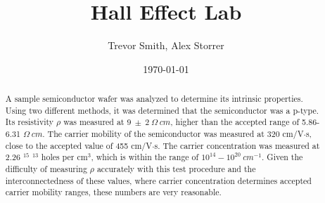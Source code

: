 \documentclass[aps,prl,reprint]{revtex4-2}
\begin{document}

\title{Hall Effect Lab}


\author{Trevor Smith, Alex Storrer}


\date{\today}

\begin{abstract}
	A sample semiconductor wafer was analyzed to determine its intrinsic properties. 
	Using two different methods, it was determined that the semiconductor was a p-type.
	Its resistivity $\rho$ was measured at $9\ \pm\ 2\ \Omega\ cm$, higher than the accepted
	range of 5.86-6.31 $\Omega\ cm$. The carrier mobility of the semiconductor was  
	measured at 320  cm/V$\cdot$s, close to the accepted value of 455 cm/V$\cdot$s. The 
	carrier concentration was measured at 2.26 $^{15}$  $^{13}$  
	holes per cm$^{3}$, which is within the range of $10^{14}-10^{20}\ cm^{-1}$. Given
	the difficulty of measuring $\rho$ accurately with this test procedure and the
	interconnectedness of these values, where carrier concentration determines accepted
	carrier mobility ranges, these numbers are very reasonable.
\end{abstract}


\maketitle

\end{document}
